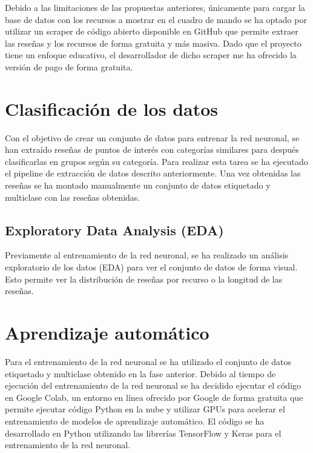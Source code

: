 Debido a las limitaciones de las propuestas anteriores, únicamente para cargar la base de datos con los recursos a mostrar en el cuadro de mando se ha optado por utilizar un scraper de código abierto disponible en GitHub\cite{scraper} que permite extraer las reseñas y los recursos de forma gratuita y más masiva.
Dado que el proyecto tiene un enfoque educativo, el desarrollador de dicho scraper me ha ofrecido la versión de pago de forma gratuita.

\section{Clasificación de los datos}

Con el objetivo de crear un conjunto de datos para entrenar la red neuronal, se han extraído reseñas de puntos de interés con categorías similares 
para después clasificarlas en grupos según su categoría.
Para realizar esta tarea se ha ejecutado el pipeline de extracción de datos descrito anteriormente.
Una vez obtenidas las reseñas se ha montado manualmente un conjunto de datos etiquetado y multiclase con las reseñas obtenidas.

\subsection{Exploratory Data Analysis (EDA)}

Previamente al entrenamiento de la red neuronal, se ha realizado un análisis exploratorio de los datos (EDA) para ver el conjunto de datos de forma visual.
Esto permite ver la distribución de reseñas por recurso o la longitud de las reseñas.


\section{Aprendizaje automático}

Para el entrenamiento de la red neuronal se ha utilizado el conjunto de datos etiquetado y multiclase obtenido en la fase anterior.
Debido al tiempo de ejecución del entrenamiento de la red neuronal se ha decidido ejecutar el código en Google Colab, un entorno en línea
ofrecido por Google de forma gratuita que permite ejecutar código Python en la nube y utilizar GPUs para acelerar el entrenamiento de modelos de aprendizaje automático.
El código se ha desarrollado en Python utilizando las librerías TensorFlow y Keras para el entrenamiento de la red neuronal.

